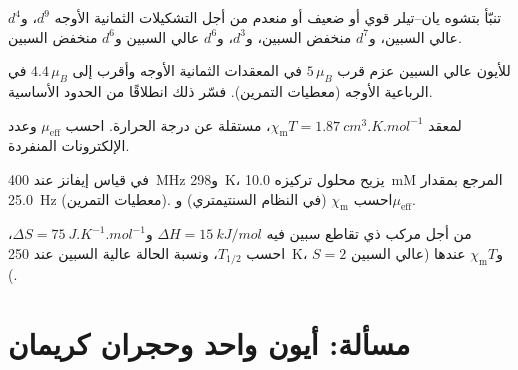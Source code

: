 \begin{exercise}[$\star\star$]\label{exo:b3:complex-spectra-magnetism:8}
تنبّأ بتشوه يان--تيلر قوي أو ضعيف أو منعدم من أجل التشكيلات الثمانية الأوجه $d^9$، و$d^4$ عالي
السبين، و$d^7$ منخفض السبين، و$d^3$، و$d^6$ عالي السبين و$d^6$ منخفض السبين.
\end{exercise}

\begin{exercise}[$\star\star$]\label{exo:b3:complex-spectra-magnetism:9}
للأيون  عالي السبين عزم قرب $5\,\mu_B$ في المعقدات الثمانية الأوجه وأقرب إلى
$4.4\,\mu_B$ في الرباعية الأوجه (معطيات التمرين). فسّر ذلك انطلاقًا من الحدود
الأساسية.
\end{exercise}

\begin{exercise}[$\star\star\star$]\label{exo:b3:complex-spectra-magnetism:10}
لمعقد $\chi_{\mathrm m}T = \qty{1.87}{cm^3.K.mol^{-1}}$، مستقلة عن درجة الحرارة. احسب $\mu_{\mathrm{eff}}$ 
وعدد الإلكترونات المنفردة.
\end{exercise}

\begin{exercise}[$\star\star\star$]\label{exo:b3:complex-spectra-magnetism:11}
في قياس إيفانز عند \qty{400}{MHz} و\qty{298}{K}، يزيح محلول تركيزه \qty{10.0}{mM}
المرجع بمقدار \qty{25.0}{Hz} (معطيات التمرين). احسب $\chi_{\mathrm m}$ (في النظام السنتيمتري) و$\mu_{\mathrm{eff}}$.
\end{exercise}

\begin{exercise}[$\star\star\star$]\label{exo:b3:complex-spectra-magnetism:12}
من أجل مركب ذي تقاطع سبين فيه $\Delta H = \qty{15}{kJ/mol}$ و$\Delta S = \qty{75}{J.K^{-1}.mol^{-1}}$، احسب $T_{1/2}$،
ونسبة الحالة عالية السبين عند \qty{250}{K}، و$\chi_{\mathrm m}T$ عندها (عالي السبين $S = 2$).
\end{exercise}

\section{مسألة: أيون واحد وحجران كريمان}

